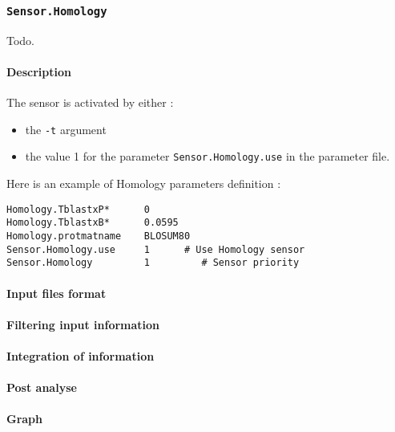 
\subsubsection{\texttt{Sensor.Homology}}

Todo.

\paragraph{Description}

The sensor is activated by either :
\begin{itemize}
\item the \texttt{-t} argument 
\item the value 1 for the parameter \texttt{Sensor.Homology.use} in the
  parameter file.
\end{itemize}
Here is an example of Homology parameters definition :
\begin{Verbatim}[fontsize=\small]
Homology.TblastxP*      0
Homology.TblastxB*      0.0595
Homology.protmatname    BLOSUM80
Sensor.Homology.use     1      # Use Homology sensor
Sensor.Homology         1         # Sensor priority
\end{Verbatim}

\paragraph{Input files format}

\paragraph{Filtering input information}

\paragraph{Integration of information}

\paragraph{Post analyse}

\paragraph{Graph}

